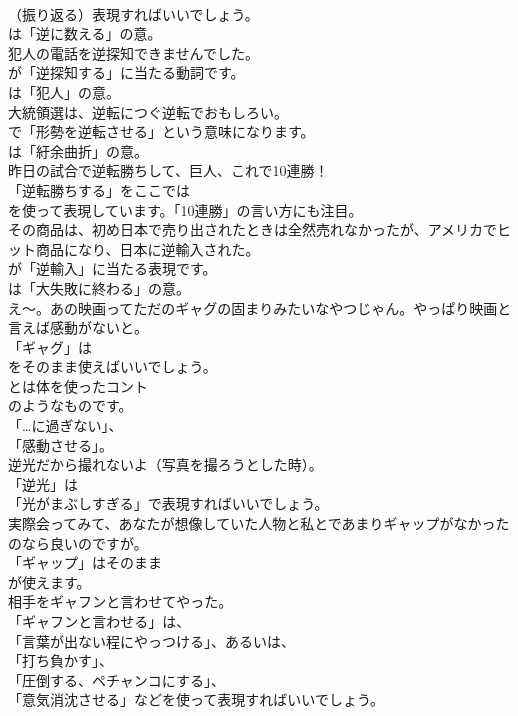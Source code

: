 \documentclass[8pt]{extreport}
\begin{document}
\begin{CJK}{UTF8}{min}
\\	（振り返る）表現すればいいでしょう。
\\	は「逆に数える」の意。	
\\	犯人の電話を逆探知できませんでした。 
\\	が「逆探知する」に当たる動詞です。
\\	は「犯人」の意。	
\\	大統領選は、逆転につぐ逆転でおもしろい。 
\\	で「形勢を逆転させる」という意味になります。
\\	は「紆余曲折」の意。	
\\	昨日の試合で逆転勝ちして、巨人、これで10連勝！ 
\\	「逆転勝ちする」をここでは
\\	を使って表現しています。「10連勝」の言い方にも注目。	
\\	その商品は、初め日本で売り出されたときは全然売れなかったが、アメリカでヒット商品になり、日本に逆輸入された。 
\\	が「逆輸入」に当たる表現です。
\\	は「大失敗に終わる」の意。	
\\	え～。あの映画ってただのギャグの固まりみたいなやつじゃん。やっぱり映画と言えば感動がないと。 
\\	「ギャグ」は
\\	をそのまま使えばいいでしょう。
\\	とは体を使ったコント
\\	のようなものです。
\\	「…に過ぎない」、
\\	「感動させる」。	
\\	逆光だから撮れないよ（写真を撮ろうとした時）。 
\\	「逆光」は
\\	「光がまぶしすぎる」で表現すればいいでしょう。	
\\	実際会ってみて、あなたが想像していた人物と私とであまりギャップがなかったのなら良いのですが。 
\\	「ギャップ」はそのまま
\\	が使えます。	
\\	相手をギャフンと言わせてやった。 
\\	「ギャフンと言わせる」は、 
\\	「言葉が出ない程にやっつける」、あるいは、
\\	「打ち負かす」、
\\	「圧倒する、ペチャンコにする」、
\\	「意気消沈させる」などを使って表現すればいいでしょう。	

\end{CJK}
\end{document}

